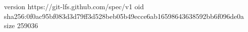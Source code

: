 version https://git-lfs.github.com/spec/v1
oid sha256:0f0ac95bf083d3d79ff3d528beb05b49ecce6ab16598643638592bb6f096de0a
size 259036
